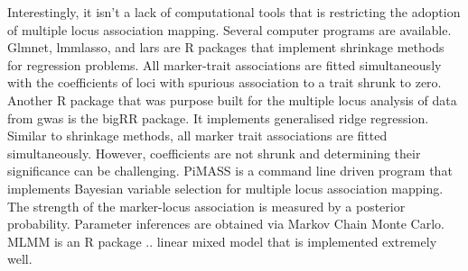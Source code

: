 \documentclass{article}
\begin{document}
Interestingly, it isn't a lack of computational tools that is restricting the adoption of multiple locus association mapping.  Several  computer programs are available. Glmnet, lmmlasso, and lars are R packages that implement shrinkage methods for regression problems.   All marker-trait associations are fitted simultaneously with the coefficients of loci with spurious association to a trait shrunk to zero. Another R package that was purpose built for the multiple locus analysis of data from gwas is the bigRR package.  It implements generalised ridge regression. Similar to shrinkage methods, all marker trait associations are fitted simultaneously. However, coefficients are not shrunk and  determining their significance  can be challenging. PiMASS is a command line driven program that implements Bayesian variable selection for multiple locus association mapping. The strength of the marker-locus association is measured by a posterior probability. Parameter inferences are obtained via Markov Chain Monte Carlo.  MLMM is an R package .. linear mixed model that is implemented extremely well. 
\end{document}
